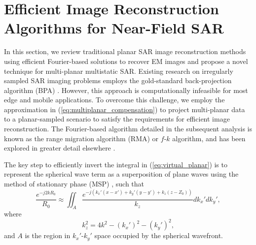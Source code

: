 \documentclass{ieeeaccess}
\begin{document}
\section{Efficient Image Reconstruction Algorithms for Near-Field SAR}
\label{sec:image_reconstruction}
In this section, we review traditional planar SAR image reconstruction methods using efficient Fourier-based solutions to recover EM images \cite{smith2022ThzToolbox} and propose a novel technique for multi-planar multistatic SAR. 
Existing research on irregularly sampled SAR imaging problems employs the gold-standard back-projection algorithm (BPA) \cite{alvarez2019freehand,alvarez2021freehand,alvarez2021freehandsystem,alvarez2021system,alvarez2021towards,garcia20203DSARProcessing,wu2020multilayered}.
However, this approach is computationally infeasible for most edge and mobile applications.
To overcome this challenge, we employ the approximation in (\ref{eq:multiplanar_compensation}) to project multi-planar data to a planar-sampled scenario to satisfy the requirements for efficient image reconstruction.
The Fourier-based algorithm detailed in the subsequent analysis is known as the range migration algorithm (RMA) or \mbox{$f$-$k$} algorithm, and has been explored in greater detail elsewhere \cite{sheen2001three,yanik2019cascaded,smith2022ThzToolbox,gao2018_1D_MIMO,fan2020linearMIMOArbitraryTopologies}.

The key step to efficiently invert the integral in (\ref{eq:virtual_planar}) is to represent the spherical wave term as a superposition of plane waves using the method of stationary phase (MSP) \cite{smith2022ThzToolbox,yanik2019sparse}, such that
\begin{equation}
\label{eq:MSP_expansion}
    \frac{e^{-j2 k R_0}}{R_0} \approx \iint_A \frac{e^{-j(k_x'(x-x') + k_y'(y-y') + k_z(z-Z_0))}}{k_z} dk_x' dk_y',
\end{equation}
where
\begin{equation}
    k_z^2 = 4k^2 - (k_x')^2 - (k_y')^2,
\end{equation}
and $A$ is the region in $k_x'$-$k_y'$ space occupied by the spherical wavefront.
\end{document}
